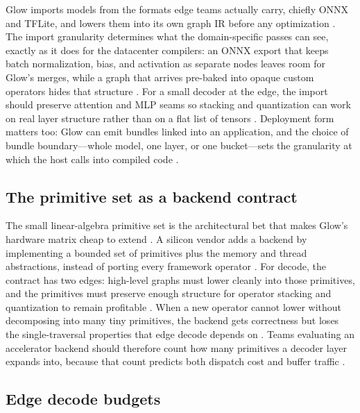Glow imports models from the formats edge teams actually carry, chiefly ONNX and TFLite, and lowers them into its own graph IR before any optimization \citep{rotem2018glow,pytorchglow2024}. The import granularity determines what the domain-specific passes can see, exactly as it does for the datacenter compilers: an ONNX export that keeps batch normalization, bias, and activation as separate nodes leaves room for Glow's merges, while a graph that arrives pre-baked into opaque custom operators hides that structure \citep{chen2020compilerbasedhardw,patel2025llminference}. For a small decoder at the edge, the import should preserve attention and MLP seams so stacking and quantization can work on real layer structure rather than on a flat list of tensors \citep{dao2022flashattention,rotem2018glow}. Deployment form matters too: Glow can emit bundles linked into an application, and the choice of bundle boundary---whole model, one layer, or one bucket---sets the granularity at which the host calls into compiled code \citep{pytorchglow2024,patel2025llminference}.

\subsection{The primitive set as a backend contract}

The small linear-algebra primitive set is the architectural bet that makes Glow's hardware matrix cheap to extend \citep{rotem2018glow,amd2024aie}. A silicon vendor adds a backend by implementing a bounded set of primitives plus the memory and thread abstractions, instead of porting every framework operator \citep{rotem2018glow,chen2020compilerbasedhardw}. For decode, the contract has two edges: high-level graphs must lower cleanly into those primitives, and the primitives must preserve enough structure for operator stacking and quantization to remain profitable \citep{rotem2018glow,taxbreak2026}. When a new operator cannot lower without decomposing into many tiny primitives, the backend gets correctness but loses the single-traversal properties that edge decode depends on \citep{memoryfloor2026,patel2025llminference}. Teams evaluating an accelerator backend should therefore count how many primitives a decoder layer expands into, because that count predicts both dispatch cost and buffer traffic \citep{rotem2018glow,memoryfloor2026}.

\subsection{Edge decode budgets}

